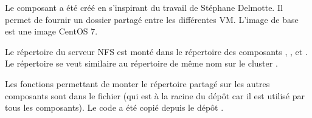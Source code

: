 Le composant  a été créé en s'inspirant du travail de Stéphane Delmotte.
Il permet de fournir un dossier partagé entre les différentes VM.
L'image de base est une image CentOS 7.

Le répertoire  du serveur NFS est monté dans le répertoire 
des composants , ,  et .
Le répertoire  se veut similaire au répertoire de même nom sur le cluster .

Les fonctions permettant de monter le répertoire partagé sur les autres composants sont dans le fichier 
(qui est à la racine du dépôt  car il est utilisé par tous les composants).
Le code a été copié depuis le dépôt .


